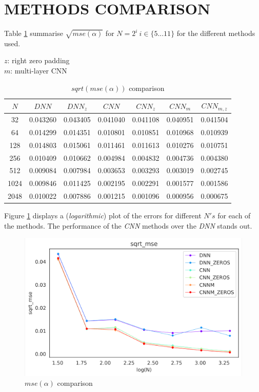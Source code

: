 \documentclass[a4paper, 12pt]{report}
\begin{document}
\pagebreak
\section{METHODS COMPARISON}
Table \ref{table:sqrt-mse-comparison} summarise $\sqrt{mse(\alpha)}$ for $N=2^i~ i\in\{5...11\}$ for the different methods used.
\begin{table}[!htb]
    \sffamily
    \scriptsize
    \caption*{
        $z$: right zero padding\\
        $m$: multi-layer CNN
    }
    \centering
    \begin{tabular}{||c c c c c c c||} 
        \hline
        $N$ & $DNN$ & $DNN_z$ & $CNN$ & $CNN_z$ & $CNN_m$ & $CNN_{m,z}$ \\ [0.5ex] 
        \hline\hline
        32 & 0.043260 & 0.043405 & 0.041040 & 0.041108 & 0.040951 & 0.041504 \\ 
        \hline
        64 & 0.014299 & 0.014351 & 0.010801 & 0.010851 & 0.010968 & 0.010939 \\
        \hline
        128 & 0.014803 & 0.015061 & 0.011461 & 0.011613 & 0.010276 & 0.010751 \\
        \hline
        256 & 0.010409 & 0.010662 & 0.004984 & 0.004832 & 0.004736 & 0.004380 \\
        \hline
        512 & 0.009084 & 0.007984 & 0.003653 & 0.003293 & 0.003019 & 0.002745 \\
        \hline
        1024 & 0.009846 & 0.011425 & 0.002195 & 0.002291 & 0.001577 & 0.001586 \\
        \hline
        2048 & 0.010022 & 0.007886 & 0.001215 & 0.001096 & 0.000956 & 0.000675 \\
        \hline
    \end{tabular}
    \caption{$sqrt(mse(\alpha))$ comparison}
    \label{table:sqrt-mse-comparison}
\end{table}

Figure \ref{fig:mse-alpha-comparison} displays a (\textit{logarithmic}) plot of the errors for different $N's$ for each of the methods. The performance of the \textit{CNN} methods over the \textit{DNN} stands out.
\begin{figure}[!htb]
\centering
\includegraphics[width=0.7\linewidth]{./sqrt_mse_compare}
\caption{$mse(\alpha)$ comparison}
\label{fig:mse-alpha-comparison}
\end{figure}
\end{document}
